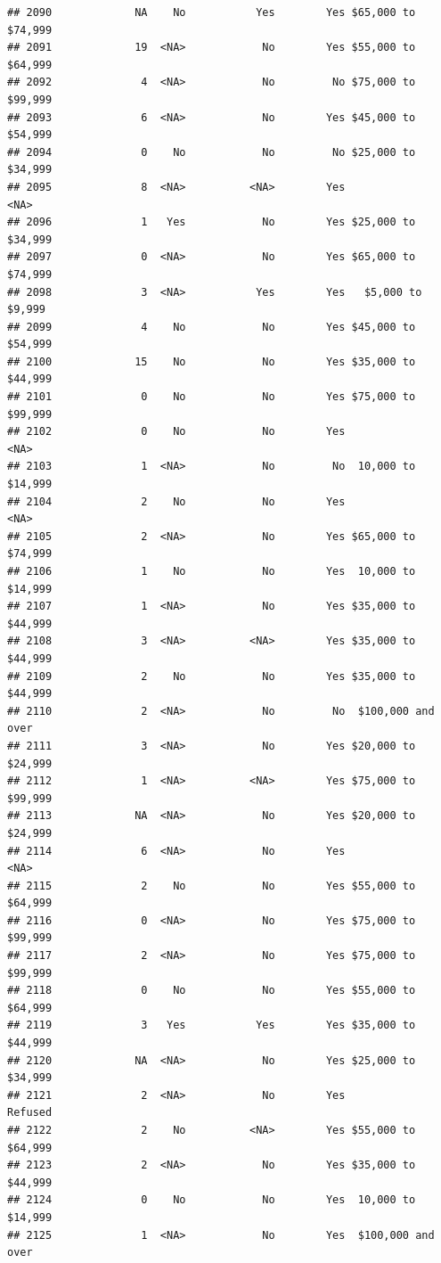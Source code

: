 \documentclass[man]{apa6}
\begin{document}
\begin{verbatim}
## 2090             NA    No           Yes        Yes $65,000 to $74,999
## 2091             19  <NA>            No        Yes $55,000 to $64,999
## 2092              4  <NA>            No         No $75,000 to $99,999
## 2093              6  <NA>            No        Yes $45,000 to $54,999
## 2094              0    No            No         No $25,000 to $34,999
## 2095              8  <NA>          <NA>        Yes               <NA>
## 2096              1   Yes            No        Yes $25,000 to $34,999
## 2097              0  <NA>            No        Yes $65,000 to $74,999
## 2098              3  <NA>           Yes        Yes   $5,000 to $9,999
## 2099              4    No            No        Yes $45,000 to $54,999
## 2100             15    No            No        Yes $35,000 to $44,999
## 2101              0    No            No        Yes $75,000 to $99,999
## 2102              0    No            No        Yes               <NA>
## 2103              1  <NA>            No         No  10,000 to $14,999
## 2104              2    No            No        Yes               <NA>
## 2105              2  <NA>            No        Yes $65,000 to $74,999
## 2106              1    No            No        Yes  10,000 to $14,999
## 2107              1  <NA>            No        Yes $35,000 to $44,999
## 2108              3  <NA>          <NA>        Yes $35,000 to $44,999
## 2109              2    No            No        Yes $35,000 to $44,999
## 2110              2  <NA>            No         No  $100,000 and over
## 2111              3  <NA>            No        Yes $20,000 to $24,999
## 2112              1  <NA>          <NA>        Yes $75,000 to $99,999
## 2113             NA  <NA>            No        Yes $20,000 to $24,999
## 2114              6  <NA>            No        Yes               <NA>
## 2115              2    No            No        Yes $55,000 to $64,999
## 2116              0  <NA>            No        Yes $75,000 to $99,999
## 2117              2  <NA>            No        Yes $75,000 to $99,999
## 2118              0    No            No        Yes $55,000 to $64,999
## 2119              3   Yes           Yes        Yes $35,000 to $44,999
## 2120             NA  <NA>            No        Yes $25,000 to $34,999
## 2121              2  <NA>            No        Yes            Refused
## 2122              2    No          <NA>        Yes $55,000 to $64,999
## 2123              2  <NA>            No        Yes $35,000 to $44,999
## 2124              0    No            No        Yes  10,000 to $14,999
## 2125              1  <NA>            No        Yes  $100,000 and over

\end{verbatim}
\end{document}

